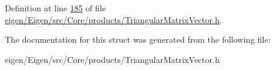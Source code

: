 Definition at line \hyperlink{eigen_2_eigen_2src_2_core_2products_2_triangular_matrix_vector_8h_source_l00185}{185} of file \hyperlink{eigen_2_eigen_2src_2_core_2products_2_triangular_matrix_vector_8h_source}{eigen/\+Eigen/src/\+Core/products/\+Triangular\+Matrix\+Vector.\+h}.



The documentation for this struct was generated from the following file\+:\begin{DoxyCompactItemize}
\item 
eigen/\+Eigen/src/\+Core/products/\+Triangular\+Matrix\+Vector.\+h\end{DoxyCompactItemize}
